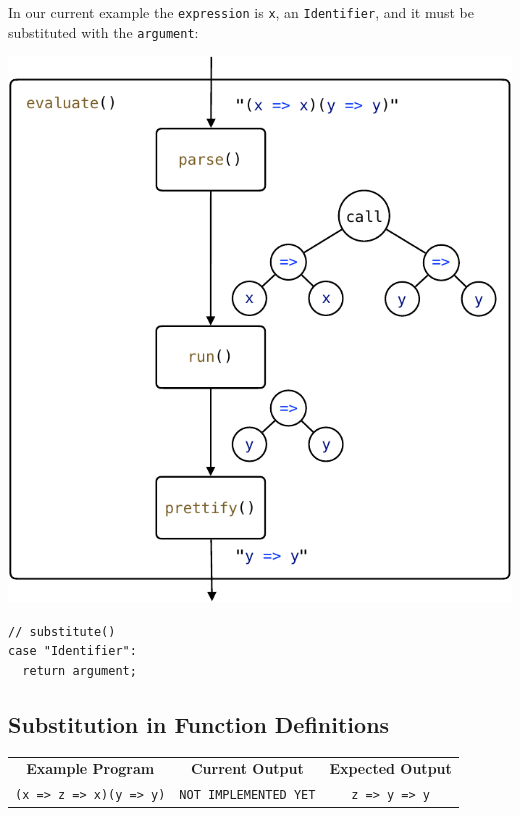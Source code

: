 \documentclass[12pt, oneside]{book}
\begin{document}
In our current example the \texttt{expression} is \texttt{x}, an \texttt{Identifier}, and it must be substituted with the \texttt{argument}:

\begin{center}
\includegraphics[page = 5]{images.pdf}
\end{center}

\begin{verbatim}
// substitute()
case "Identifier":
  return argument;
\end{verbatim}

\subsection{Substitution in Function Definitions}
\label{Substitution in Function Definitions}

\begin{center}
\begin{tabular}{c|c|c}
\textbf{Example Program} & \textbf{Current Output} & \textbf{Expected Output} \\
\texttt{(x => z => x)(y => y)} & \texttt{NOT IMPLEMENTED YET} & \texttt{z => y => y} \\
\end{tabular}
\end{center}
\end{document}
